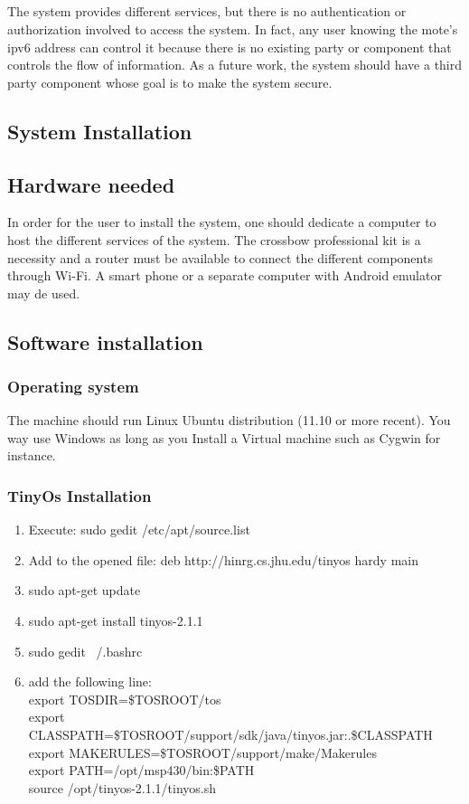 \documentclass[12pt,a4paper,final]{report}
\begin{document}
\paragraph{}
The system provides different services, but there is no authentication or authorization involved to access the system. In fact, any user knowing the mote's \gls{ipv6} address can control it because there is no existing party or component that controls the flow of information. As a future work, the system should have a third party component whose goal is to make the system secure.

\renewcommand{\bibname}{Index}
 


\begin{appendices}
\chapter{System Installation}
\section{Hardware needed}
In order for the user to install the system, one should dedicate a computer to host the different services of the system. The crossbow professional kit is a necessity and a router must be available to connect the different components through Wi-Fi. A smart phone or a separate computer with Android emulator may de used.

\section{Software installation}

\subsection{Operating system}
The machine should run Linux Ubuntu distribution (11.10 or more recent). You way use Windows as long as you Install a Virtual machine such as Cygwin for instance.
\subsection{TinyOs Installation}
\begin{enumerate}
\item Execute: sudo gedit /etc/apt/source.list
\item Add to the opened file: deb http://hinrg.cs.jhu.edu/tinyos hardy main
\item sudo apt-get update 
\item sudo apt-get install tinyos-2.1.1
\item sudo gedit ~/.bashrc
\item add the following line: \\
export TOSDIR=\$TOSROOT/tos \\
export CLASSPATH=\$TOSROOT/support/sdk/java/tinyos.jar:.\$CLASSPATH \\
export MAKERULES=\$TOSROOT/support/make/Makerules \\
export PATH=/opt/msp430/bin:\$PATH \\
source /opt/tinyos-2.1.1/tinyos.sh \\


\end{enumerate}
\end{appendices}
\end{document}
